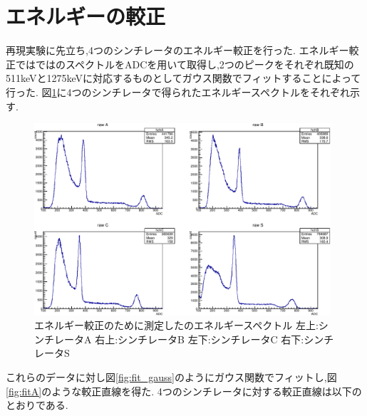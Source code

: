 \section{エネルギーの較正}
再現実験に先立ち,4つのシンチレータのエネルギー較正を行った.
エネルギー較正ではではのスペクトルをADCを用いて取得し,2つのピークをそれぞれ既知の511keVと1275keVに対応するものとしてガウス関数でフィットすることによって行った.
図\ref{fig:calibration_raw_data}に4つのシンチレータで得られたエネルギースペクトルをそれぞれ示す.
\begin{figure}[H]
	\centering
		\includegraphics[width=11cm]{fig/isb/cal7001.pdf}
		\caption{エネルギー較正のために測定したのエネルギースペクトル \newline 左上:シンチレータA 右上:シンチレータB 左下:シンチレータC 右下:シンチレータS}
		\label{fig:calibration_raw_data}
\end{figure}
これらのデータに対し図\ref{fig:fit_gauss}のようにガウス関数でフィットし,図\ref{fig:fitA}のような較正直線を得た.
4つのシンチレータに対する較正直線は以下のとおりである.
